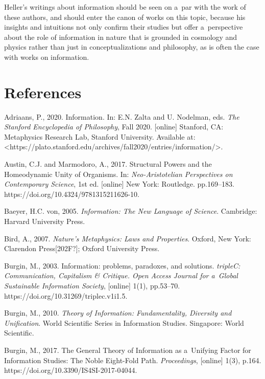 Heller's writings about information should be seen on a~par with the work of these authors, and should enter the canon of works on this topic, because his insights and intuitions not only confirm their studies but offer a~perspective about the role of information in nature that is grounded in cosmology and physics rather than just in conceptualizations and philosophy, as is often the case with works on information.



\section{References}

Adriaans, P., 2020. Information. In: E.N. Zalta and U. Nodelman, eds. \textit{The Stanford Encyclopedia of Philosophy}, Fall 2020. [online] Stanford, CA: Metaphysics Research Lab, Stanford University. Available at: {\textless}https://plato.stanford.edu/archives/fall2020/entries/information/{\textgreater}.



Austin, C.J. and Marmodoro, A., 2017. Structural Powers and the Homeodynamic Unity of Organisms. In: \textit{Neo-Aristotelian Perspectives on Contemporary Science}, 1st ed. [online] New York: Routledge. pp.169–183. https://doi.org/10.4324/9781315211626-10.



Baeyer, H.C. von, 2005. \textit{Information: The New Language of Science}. Cambridge: Harvard University Press.



Bird, A., 2007. \textit{Nature's Metaphysics: Laws and Properties}. Oxford, New York: Clarendon Press[202F?]; Oxford University Press.



Burgin, M., 2003. Information: problems, paradoxes, and solutions. \textit{tripleC: Communication, Capitalism \& Critique. Open Access Journal for a~Global Sustainable Information Society}, [online] 1(1), pp.53–70. https://doi.org/10.31269/triplec.v1i1.5.



Burgin, M., 2010. \textit{Theory of Information: Fundamentality, Diversity and Unification}. World Scientific Series in Information Studies. Singapore: World Scientific.



Burgin, M., 2017. The General Theory of Information as a~Unifying Factor for Information Studies: The Noble Eight-Fold Path. \textit{Proceedings}, [online] 1(3), p.164. https://doi.org/10.3390/IS4SI-2017-04044.



